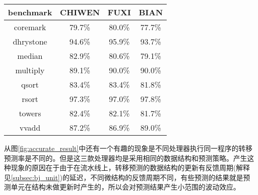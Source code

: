 \begin{table}[!htbp]
	\label{tab:accurate_result}
	\centering
	\footnotesize%
	\setlength{\tabcolsep}{4pt}%
	\renewcommand{\arraystretch}{1.2}%
	\begin{tabular}{cccc}
		\hline
		benchmark & CHIWEN & FUXI & BIAN \\%
		\hline
		coremark    & 79.7\% & 80.0\% & 77.7\% \\
		dhrystone   & 94.6\% & 95.9\% & 93.7\% \\
		median 		& 82.9\% & 80.6\% & 79.1\% \\
		multiply 	& 89.1\% & 90.0\% & 90.0\% \\
		qsort  		& 83.4\% & 83.4\% & 81.8\% \\
		rsort  		& 97.3\% & 97.0\% & 97.8\% \\
		towers 		& 82.4\% & 82.1\% & 81.7\% \\
		vvadd 		& 87.2\% & 86.9\% & 89.0\% \\
		\hline
	\end{tabular}
\end{table}

从图\ref{fig:accurate_result}中还有一个有趣的现象是不同处理器执行同一程序的转移预测率是不同的。但是这三款处理器均是采用相同的数据结构和预测策略。产生这种现象的原因在于由于在流水线上，转移预测的数据结构的更新有反馈周期(解释见\ref{subsec:bj_unit})的延迟，不同微结构的反馈周期不同，有些预测的结果就是预测单元在结构未做更新时产生的，所以会对预测结果产生小范围的波动效应。

